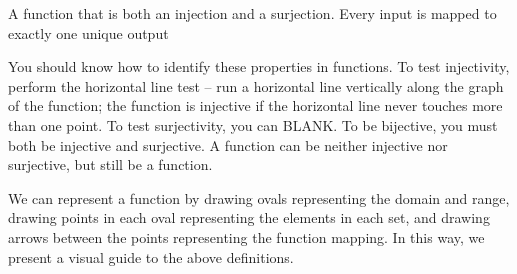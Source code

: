 \documentclass[main.tex]{subfiles}
\begin{document}
\begin{defn}
	A function that is both an injection and a surjection. Every input is mapped to exactly one unique output
\end{defn}

You should know how to identify these properties in functions. To test injectivity, perform the horizontal line test -- run a horizontal line vertically along the graph of the function; the function is injective if the horizontal line never touches more than one point. To test surjectivity, you can BLANK. To be bijective, you must both be injective and surjective. A function can be neither injective nor surjective, but still be a function.

We can represent a function by drawing ovals representing the domain and range, drawing points in each oval representing the elements in each set, and drawing arrows between the points representing the function mapping. In this way, we present a visual guide to the above definitions.
\end{document}
